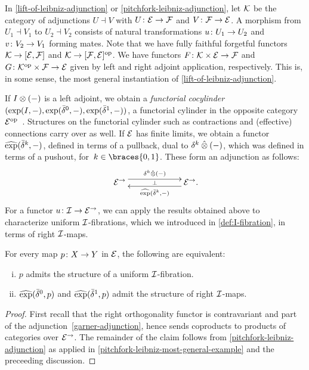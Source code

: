 \documentclass[reqno,10pt,a4paper,oneside,draft]{amsart}
\begin{document}
\begin{remark} \label{pitchfork-leibniz-most-general-example}
In \cref{lift-of-leibniz-adjunction} or \cref{pitchfork-leibniz-adjunction}, let $\cal{K}$ be the category of adjunctions $U \dashv V$ with $U \co \catE \to \cal{F}$ and $V \co \cal{F} \to \catE$.
A morphism from $U_1 \dashv V_1$ to $U_2 \dashv V_2$ consists of natural transformations $u \co U_1 \to U_2$ and $v \co V_2 \to V_1$ forming mates.
Note that we have fully faithful forgetful functors $\cal{K} \to [\catE, \cal{F}]$ and $\cal{K} \to [\cal{F}, \catE]^{\op}$.
We have functors $F \co \cal{K} \times \catE \to \cal{F}$ and $G \co \cal{K}^{\op} \times \cal{F} \to \catE$ given by left and right adjoint application, respectively.
This is, in some sense, the most general instantiation of \cref{lift-of-leibniz-adjunction}.
\end{remark}

If $\interval \otimes (-)$ is a left adjoint, we obtain a \emph{functorial cocylinder} $(\exp(\interval, -), \exp(\bar{\delta}^0, -), \exp(\bar{\delta}^1, -))$, \ie a functorial cylinder in the opposite category $\catE^{\op}$~\cite{kamps-porter:homotopy}.
Structures on the functorial cylinder such as contractions and (effective) connections carry over as well.
If $\calE$ has finite limits, we obtain a functor $\hatexp(\bar{\delta}^k, -)$, defined in terms of a pullback, dual to $\kcyl \hatotimes (-)$, which was defined in terms of a pushout, for~$k \in \braces{0, 1}$.
These form an adjunction as follows:
\[
\xymatrix@C+4em{
  \catE^\to
  \ar@<1ex>[r]^{\kcyl \hatotimes (-)}
  \ar@{}[r]|{\bot}
&
  \catE^\to
  \ar@<1ex>[l]^{\hatexp(\bar{\delta}^k, -)}
\rlap{.}}
\]
For a functor $u \co \cal{I} \to \catE^\to$, we can apply the results obtained above to characterize uniform $\cal{I}$-fibrations, which we introduced in \cref{def:I-fibration}, in terms of right $\cal{I}$-maps.

\begin{proposition} \label{prod-exp-general}
For every map $p \co X \to Y$ in $\catE$, the following are equivalent:
\begin{enumerate}[(i)]
\item $p$ admits the structure of a uniform $\cal{I}$-fibration.
\item $\hatexp(\bar{\delta}^0, p)$ and $\hatexp(\bar{\delta}^1, p)$ admit the structure of right $\cal{I}$-maps.
\end{enumerate}
\end{proposition}

\begin{proof}
First recall that the right orthogonality functor is contravariant and part of the adjunction~\eqref{garner-adjunction}, hence sends coproducts to products of categories over $\catE^\to$.
The remainder of the claim follows from \cref{pitchfork-leibniz-adjunction} as applied in \cref{pitchfork-leibniz-most-general-example} and the preceeding discussion.
\end{proof}
\end{document}
